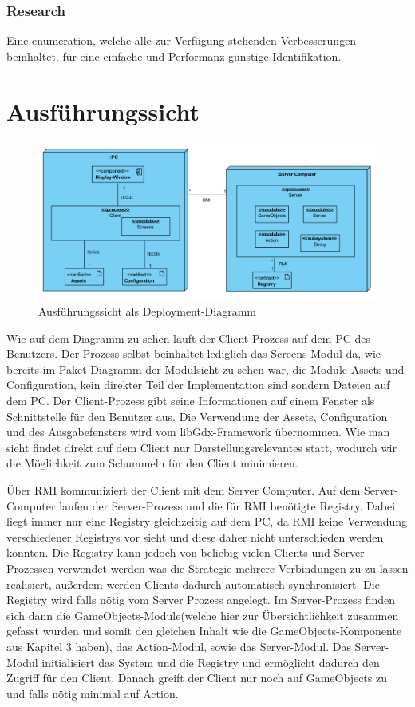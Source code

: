 \documentclass[fontsize=12pt,paper=a4,twoside]{scrartcl}
\begin{document}
\subsubsection{Research}

Eine enumeration, welche alle zur Verfügung stehenden Verbesserungen beinhaltet, für eine einfache und Performanz-günstige Identifikation.


\section{Ausführungssicht}

\label{sec:ausfuehrung}

\begin{figure}[h]
\centering
\includegraphics[width=1.0\linewidth]{Deployment}
\caption{Ausführungssicht als Deployment-Diagramm}
\label{fig:Deployment}
\end{figure}

Wie auf dem Diagramm zu sehen läuft der Client-Prozess auf dem PC des Benutzers. Der Prozess selbst beinhaltet lediglich das Screens-Modul da, wie bereits im Paket-Diagramm der Modulsicht zu sehen war, die Module Assets und Configuration, kein direkter Teil der Implementation sind sondern Dateien auf dem PC. Der Client-Prozess gibt seine Informationen auf einem Fenster als Schnittstelle für den Benutzer aus. Die Verwendung der Assets, Configuration und des Ausgabefensters wird vom libGdx-Framework übernommen. Wie man sieht findet direkt auf dem Client nur Darstellungsrelevantes statt, wodurch wir die Möglichkeit zum Schummeln für den Client minimieren.

Über RMI kommuniziert der Client mit dem Server Computer. Auf dem Server-Computer laufen der Server-Prozess und die für RMI benötigte Registry. Dabei liegt immer nur eine Registry gleichzeitig auf dem PC, da RMI keine Verwendung verschiedener Registrys vor sieht und diese daher nicht unterschieden werden könnten. Die Registry kann jedoch von beliebig vielen Clients und Server-Prozessen verwendet werden was die Strategie mehrere Verbindungen zu zu lassen realisiert, außerdem werden Clients dadurch automatisch synchronisiert. Die Registry wird falls nötig vom Server Prozess angelegt. Im Server-Prozess finden sich dann die GameObjects-Module(welche hier zur Übersichtlichkeit zusammen gefasst wurden und somit den gleichen Inhalt wie die GameObjects-Komponente aus Kapitel 3 haben), das Action-Modul, sowie das Server-Modul. Das Server-Modul initialisiert das System und die Registry und ermöglicht dadurch den Zugriff für den Client. Danach greift der Client nur noch auf GameObjects zu und falls nötig minimal auf Action. 
\end{document}
